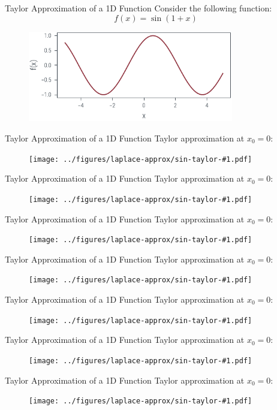 \documentclass{beamer}
\begin{document}
\begin{frame}{Taylor Approximation of a 1D Function}
    Consider the following function:
    \begin{equation*}
        f(x) = \sin(1+x)
    \end{equation*}
    \begin{figure}
        \includegraphics[width=0.8\textwidth]{../figures/laplace-approx/sin.pdf}
    \end{figure}

\end{frame}

\newcommand{\taylor}[1]{
    \begin{frame}{Taylor Approximation of a 1D Function}
        Taylor approximation at $x_0 = 0$:
        \begin{figure}
            \texttt{[image: ../figures/laplace-approx/sin-taylor-\#1.pdf]}
        \end{figure}
    \end{frame}
}

\taylor{0}
\taylor{1}
\taylor{2}
\taylor{3}
\taylor{4}
\taylor{5}
\taylor{12}
\end{document}
